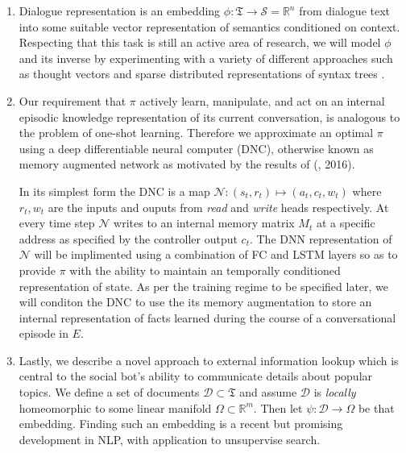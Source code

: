 \documentclass{article} %
\theoremstyle{named}
\def\scriptd{{\mathcal D}}
\def\scriptn{{\mathcal N}}
\def\scripts{{\mathcal S}}
\begin{document}
\begin{enumerate}
\item Dialogue representation is an embedding $ \phi: \mathfrak{T} \to \scripts = \mathbb{R}^n $ from dialogue text into some suitable vector representation of semantics conditioned on context. Respecting that this task is still an active area of research, we will model $ \phi $ and its inverse by experimenting with a variety of different approaches such as thought vectors \cite{NIPS2015_5950} and sparse distributed representations of syntax trees \cite{DBLP:journals/corr/YogatamaFDS14}.

\item Our requirement that $ \pi $ actively learn, manipulate, and act on an internal episodic knowledge representation of its current conversation, is analogous to the problem of one-shot learning. Therefore we approximate an optimal $ \pi $ using a deep differentiable neural computer (DNC)\cite{graves2016hybrid}\cite{DBLP:journals/corr/GravesWD14}, otherwise known as memory augmented network as motivated by the results of (\citeauthor{DBLP:journals/corr/SantoroBBWL16}, 2016).

In its simplest form the DNC is a map $\scriptn: (s_t, r_t) \mapsto (a_t, c_t, w_t)$ where  $r_t, w_t$ are the inputs and ouputs from \emph{read} and \emph{write} heads respectively. At every time step $\scriptn$ writes to an internal memory matrix $M_t$ at a specific address as specified by the controller output $c_t$. The DNN representation of $\scriptn$ will be implimented using a combination of FC and LSTM layers so as to provide $\pi$ with the ability to maintain an temporally conditioned representation of state. As per the training regime to be specified later, we will conditon the DNC to use the its memory augmentation to store an internal representation of facts learned during the course of a conversational episode in $E$.


\item Lastly, we describe a novel approach to external information lookup which is central to the social bot's ability to communicate details about popular topics. We define a set of documents $\scriptd \subset \mathfrak{T}$ and assume $\scriptd$ is \emph{locally} homeomorphic to some linear manifold $\Omega \subset \mathbb{R}^m$. Then let $\psi: \scriptd \to \Omega$ be that embedding. Finding such an embedding is a recent but promising development in NLP, with application to unsupervise search\cite{DBLP:journals/corr/DaiOL15}.


\end{enumerate}
\end{document}
